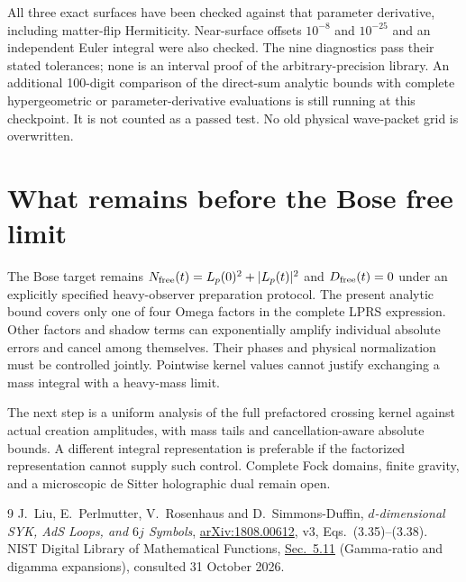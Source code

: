 \documentclass[11pt,a4paper]{article}
\begin{document}
All three exact surfaces have been checked against that parameter
derivative, including matter-flip Hermiticity. Near-surface offsets
$10^{-8}$ and $10^{-25}$ and an independent Euler integral were also
checked. The nine diagnostics pass their stated tolerances; none is
an interval proof of the arbitrary-precision library.
An additional 100-digit comparison of the direct-sum analytic bounds
with complete hypergeometric or parameter-derivative evaluations is
still running at this checkpoint. It is not counted as a passed test.
No old physical wave-packet grid is overwritten.

\section{What remains before the Bose free limit}
The Bose target remains
$N_{\rm free}(t)=L_p(0)^2+|L_p(t)|^2$ and $D_{\rm free}(t)=0$
under an explicitly specified heavy-observer preparation protocol.
The present analytic bound covers only one of four Omega factors in
the complete LPRS expression. Other factors and shadow terms can
exponentially amplify individual absolute errors and cancel among
themselves. Their phases and physical normalization must be controlled
jointly. Pointwise kernel values cannot justify exchanging a mass
integral with a heavy-mass limit.

The next step is a uniform analysis of the full prefactored crossing
kernel against actual creation amplitudes, with mass tails and
cancellation-aware absolute bounds. A different integral
representation is preferable if the factorized representation cannot
supply such control. Complete Fock domains, finite gravity, and a
microscopic de Sitter holographic dual remain open.

\begin{thebibliography}{9}
 J.~Liu, E.~Perlmutter, V.~Rosenhaus and D.~Simmons-Duffin,
\emph{$d$-dimensional SYK, AdS Loops, and $6j$ Symbols},
\href{https://arxiv.org/abs/1808.00612}{arXiv:1808.00612}, v3,
Eqs.~(3.35)--(3.38).
 NIST Digital Library of Mathematical Functions,
\href{https://dlmf.nist.gov/5.11}{Sec.~5.11}
(Gamma-ratio and digamma expansions), consulted 31 October 2026.
\end{thebibliography}
\end{document}
